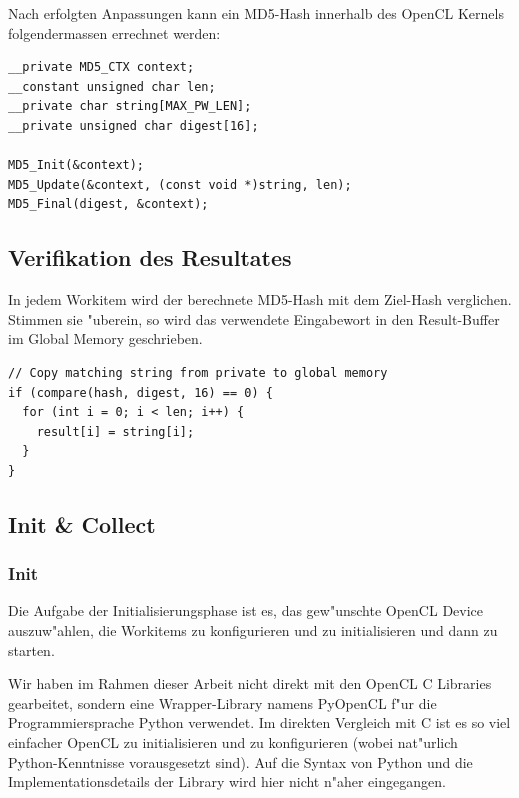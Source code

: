 \begin{refsection}
Nach erfolgten Anpassungen kann ein MD5-Hash innerhalb des OpenCL Kernels
folgendermassen errechnet werden:

\begin{small}
\begin{verbatim}
__private MD5_CTX context;
__constant unsigned char len;
__private char string[MAX_PW_LEN];
__private unsigned char digest[16];

MD5_Init(&context);
MD5_Update(&context, (const void *)string, len);
MD5_Final(digest, &context);
\end{verbatim}
\end{small}

\subsection{Verifikation des Resultates}
\label{crypto:verifikation}

In jedem Workitem wird der berechnete MD5-Hash mit dem Ziel-Hash verglichen.
Stimmen sie "uberein, so wird das verwendete Eingabewort in den Result-Buffer im
Global Memory geschrieben.

\begin{small}
\begin{verbatim}
// Copy matching string from private to global memory
if (compare(hash, digest, 16) == 0) {
  for (int i = 0; i < len; i++) {
    result[i] = string[i];
  }
}
\end{verbatim}
\end{small}

\subsection{Init \& Collect}

\subsubsection{Init}

Die Aufgabe der Initialisierungsphase ist es, das gew"unschte OpenCL Device
auszuw"ahlen, die Workitems zu konfigurieren und zu initialisieren und dann zu
starten.

Wir haben im Rahmen dieser Arbeit nicht direkt mit den OpenCL C Libraries
gearbeitet, sondern eine Wrapper-Library namens
PyOpenCL\cite{crypto:pyopencl_docs} f"ur die Programmiersprache
Python\cite{crypto:python} verwendet. Im direkten Vergleich mit C ist es so viel
einfacher OpenCL zu initialisieren und zu konfigurieren (wobei nat"urlich
Python-Kenntnisse vorausgesetzt sind). Auf die Syntax von Python und die
Implementationsdetails der Library wird hier nicht n"aher eingegangen.


\end{refsection}
